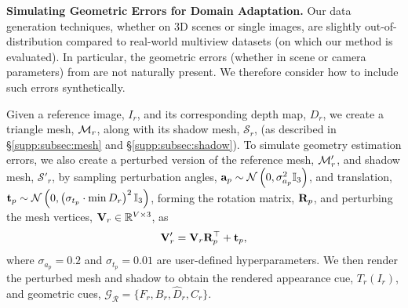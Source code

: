 \noindent\textbf{Simulating Geometric Errors for Domain Adaptation.}
Our data generation techniques, whether on 3D scenes or single images, are slightly out-of-distribution compared to real-world multiview datasets (on which our method is evaluated).
In particular, the geometric errors (whether in scene or camera parameters) from \duster are not naturally present.
We therefore consider how to include such errors synthetically.

Given a reference image, $I_r$, and its corresponding depth map, $D_r$, we create a triangle mesh, $\mathcal{M}_r$, along with its shadow mesh, $\mathcal{S}_r$, (as described in \S\ref{supp:subsec:mesh} and \S\ref{supp:subsec:shadow}). To simulate geometry estimation errors, we also create a perturbed version of the reference mesh, $\mathcal{M}'_r$, and shadow mesh, $\mathcal{S}'_r$, by sampling perturbation angles, $\mathbf{a}_p \sim \mathcal{N}\left(0, \sigma_{a_p}^2 \mathbb{I}_3\right)$, and translation, $\mathbf{t}_p \sim \mathcal{N}\left(0, \left(\sigma_{t_p} \cdot \min D_r\right)^2 \mathbb{I}_3\right)$, forming the rotation matrix, $\mathbf{R}_p$, and perturbing the mesh vertices, $\mathbf{V}_r \in \mathbb{R}^{V \times 3}$, as
\begin{equation}
\mathbf{V}'_r = \mathbf{V}_r \mathbf{R}_p^\top + \mathbf{t}_p,
\end{equation}
where $\sigma_{a_p} = 0.2$ and $\sigma_{t_p} = 0.01$ are user-defined hyperparameters. We then render the perturbed mesh and shadow to obtain the rendered appearance cue, $T_r(I_r)$, and geometric cues, $\mathcal{G}_\mathcal{R} = \{F_r, B_r, \widehat{D}_r, C_r\}$. 

